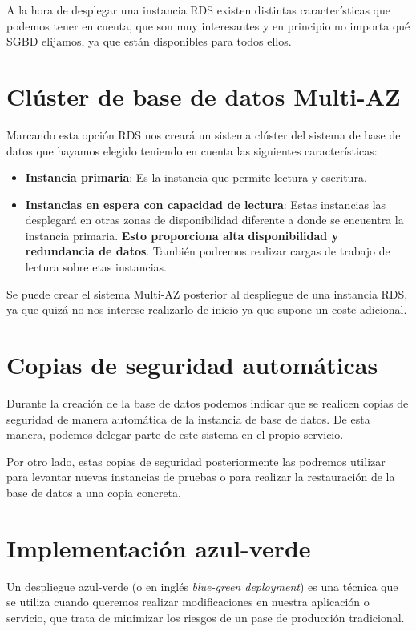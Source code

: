 A la hora de desplegar una instancia RDS existen distintas características que podemos tener en cuenta, que son muy interesantes y en principio no importa qué SGBD elijamos, ya que están disponibles para todos ellos.

\section{Clúster de base de datos Multi-AZ}

Marcando esta opción RDS nos creará un sistema clúster del sistema de base de datos que hayamos elegido teniendo en cuenta las siguientes características:

\begin{itemize}
	\item \textbf{Instancia primaria}: Es la instancia que permite lectura y escritura.
	\item \textbf{Instancias en espera con capacidad de lectura}: Estas instancias las desplegará en otras zonas de disponibilidad diferente a donde se encuentra la instancia primaria. \textbf{Esto proporciona alta disponibilidad y redundancia de datos}. También podremos realizar cargas de trabajo de lectura sobre etas instancias.
\end{itemize}

Se puede crear el sistema Multi-AZ posterior al despliegue de una instancia RDS, ya que quizá no nos interese realizarlo de inicio ya que supone un coste adicional.


\section{Copias de seguridad automáticas}

Durante la creación de la base de datos podemos indicar que se realicen copias de seguridad de manera automática de la instancia de base de datos. De esta manera, podemos delegar parte de este sistema en el propio servicio.

Por otro lado, estas copias de seguridad posteriormente las podremos utilizar para levantar nuevas instancias de pruebas o para realizar la restauración de la base de datos a una copia concreta.


\section{Implementación azul-verde}

Un despliegue azul-verde (o en inglés \textit{blue-green deployment}) es una técnica que se utiliza cuando queremos realizar modificaciones en nuestra aplicación o servicio, que trata de minimizar los riesgos de un pase de producción tradicional.

